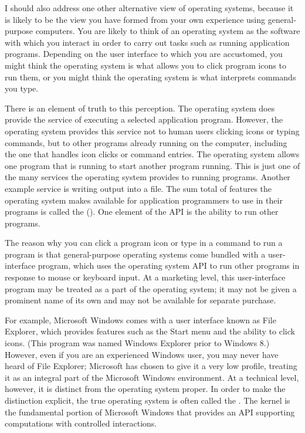 I should also address one other alternative view of operating systems,
because it is likely to be the view you have formed from your own
experience using general-purpose computers.  You are likely to think
of an operating system as the software with which you interact in order to
carry out tasks such as running application programs.  Depending on
the user interface to which you are accustomed, you might think the
operating system is what allows you to click program icons to run
them, or you might think the operating system is what interprets
commands you type.

There is an element of truth to this perception.  The operating system
does provide the service of executing a selected application program.
However, the operating system provides this service not to human users
clicking icons or typing commands, but to other programs already
running on the computer, including the one that handles icon clicks or
command entries.  The operating system allows one program that is
running to start another program running.  This is just one of the
many services the operating system provides to running programs.
Another example service is
writing output into a file.  The sum total of features the
operating system makes available for application programmers to use in
their programs is called the 
().  One element of the API is the ability to run other programs.

The reason why you can click a program icon or type in a command to
run a program is that general-purpose operating systems come bundled
with a user-interface program, which uses the operating system API to
run other programs in response to mouse or keyboard input.  At a
marketing level, this user-interface program may be treated as a part of
the operating system; it may not be given a prominent name of its own
and may not be available for separate purchase.

For example, Microsoft Windows comes with a user interface known as
File Explorer, which provides features such as the Start menu and the
ability to click icons.  (This program was named Windows Explorer prior
to Windows 8.) However, even if you
are an experienced Windows user, you may never have heard of File Explorer;
Microsoft has chosen to give it a very low profile, treating it as an
integral part of the Microsoft Windows environment.  At a technical
level, however, it is distinct from the operating system proper.  In
order to make the distinction explicit, the true operating system is
often called the .  The kernel is the fundamental
portion of Microsoft Windows that provides an API supporting
computations with controlled interactions.

